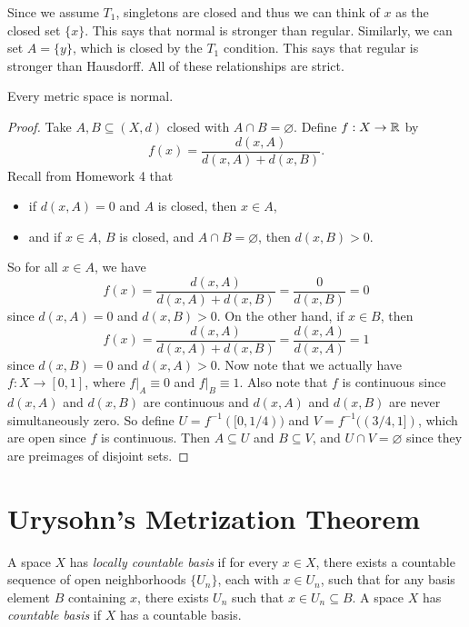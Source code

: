 \begin{remark}
  Since we assume $T_1$, singletons are closed
  and thus we can think of $x$ as the closed set
  $\{x\}$. This says that normal is stronger than
  regular. Similarly, we can set $A = \{y\}$, which
  is closed by the $T_1$ condition.
  This says that regular is stronger
  than Hausdorff. All of these relationships are
  strict.
\end{remark}

\begin{prop}
  Every metric space is normal.
\end{prop}

\begin{proof}
  Take $A, B \subseteq (X, d)$ closed with
  $A \cap B = \varnothing$. Define $f : X \to \mathbb{R}$
  by
  \[
    f(x) = \frac{d(x, A)}{d(x, A) + d(x, B)}.
  \]
  Recall from Homework 4 that
  \begin{itemize}
    \item if $d(x, A) = 0$ and $A$ is closed, then
      $x \in A$,
    \item and if $x \in A$, $B$ is closed, and
      $A \cap B = \varnothing$, then
      $d(x, B) > 0$.
  \end{itemize}
  So for all $x \in A$, we have
  \[
    f(x) = \frac{d(x, A)}{d(x, A) + d(x, B)}
    = \frac{0}{d(x, B)} = 0
  \]
  since $d(x, A) = 0$ and
  $d(x, B) > 0$. On the other hand,
  if $x \in B$, then
  \[
    f(x) = \frac{d(x, A)}{d(x, A) + d(x, B)}
    = \frac{d(x, A)}{d(x, A)} = 1
  \]
  since $d(x, B) = 0$ and $d(x, A) > 0$. Now note that
  we actually have $f : X \to [0, 1]$, where
  $f|_A \equiv 0$ and $f|_B \equiv 1$. Also note
  that $f$ is continuous since $d(x, A)$ and $d(x, B)$
  are continuous and $d(x, A)$ and $d(x, B)$ are
  never simultaneously zero. So define
  $U = f^{-1}([0, 1 / 4))$ and $V = f^{-1}((3 / 4, 1])$,
  which are open since $f$ is continuous.
  Then $A \subseteq U$ and $B \subseteq V$,
  and $U \cap V = \varnothing$ since they are
  preimages of disjoint sets.
\end{proof}

\section{Urysohn's Metrization Theorem}
\begin{definition}
  A space $X$ has \emph{locally countable basis}
  if for every $x \in X$, there exists
  a countable sequence of open neighborhoods
  $\{U_n\}$, each with $x \in U_n$, such that
  for any basis element $B$ containing $x$, there
  exists $U_n$ such that $x \in U_n \subseteq B$. A
  space $X$ has \emph{countable basis} if $X$ has
  a countable basis.
\end{definition}

